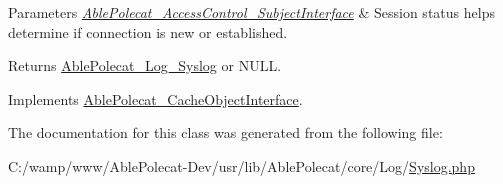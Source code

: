 \begin{DoxyParams}{Parameters}
{\em \hyperlink{interface_able_polecat___access_control___subject_interface}{Able\+Polecat\+\_\+\+Access\+Control\+\_\+\+Subject\+Interface}} & Session status helps determine if connection is new or established.\\
\hline
\end{DoxyParams}
\begin{DoxyReturn}{Returns}
\hyperlink{class_able_polecat___log___syslog}{Able\+Polecat\+\_\+\+Log\+\_\+\+Syslog} or N\+U\+L\+L. 
\end{DoxyReturn}


Implements \hyperlink{interface_able_polecat___cache_object_interface_a3f2135f6ad45f51d075657f6d20db2cd}{Able\+Polecat\+\_\+\+Cache\+Object\+Interface}.



The documentation for this class was generated from the following file\+:\begin{DoxyCompactItemize}
\item 
C\+:/wamp/www/\+Able\+Polecat-\/\+Dev/usr/lib/\+Able\+Polecat/core/\+Log/\hyperlink{_syslog_8php}{Syslog.\+php}\end{DoxyCompactItemize}
